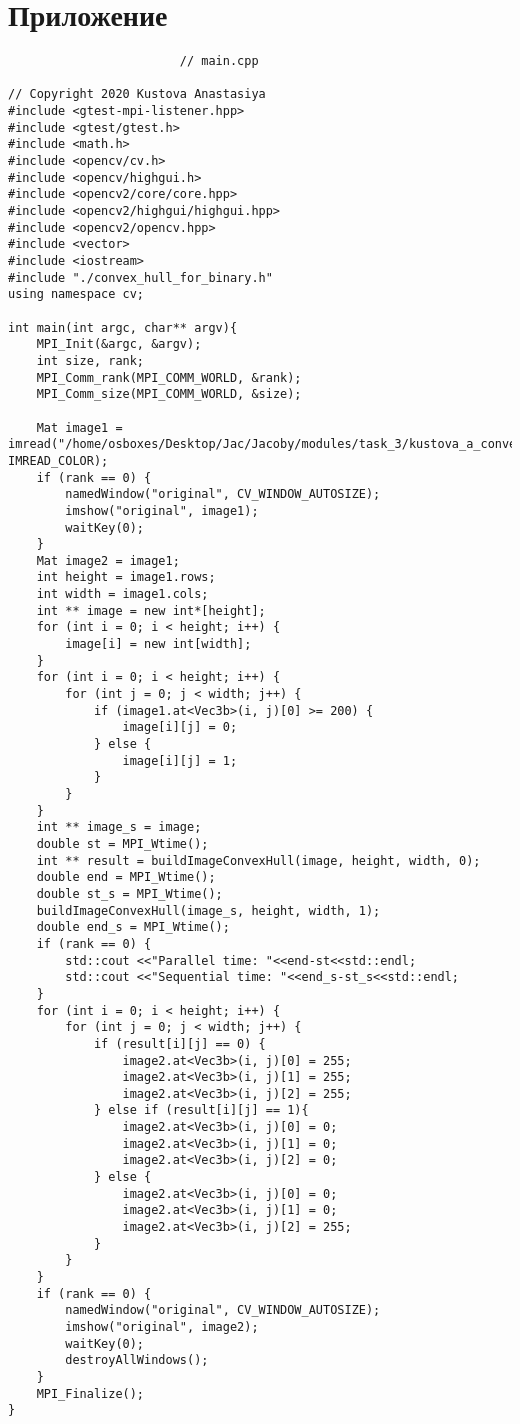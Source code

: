 \documentclass{report}
\begin{document}
\section*{Приложение}
\begin{lstlisting}
						// main.cpp

// Copyright 2020 Kustova Anastasiya
#include <gtest-mpi-listener.hpp>
#include <gtest/gtest.h>
#include <math.h>
#include <opencv/cv.h>
#include <opencv/highgui.h>
#include <opencv2/core/core.hpp>
#include <opencv2/highgui/highgui.hpp>
#include <opencv2/opencv.hpp>
#include <vector>
#include <iostream>
#include "./convex_hull_for_binary.h"
using namespace cv;

int main(int argc, char** argv){
    MPI_Init(&argc, &argv);
    int size, rank;
    MPI_Comm_rank(MPI_COMM_WORLD, &rank);
    MPI_Comm_size(MPI_COMM_WORLD, &size);

    Mat image1 = imread("/home/osboxes/Desktop/Jac/Jacoby/modules/task_3/kustova_a_convex_hull_for_binary/6.jpg", IMREAD_COLOR);
    if (rank == 0) {
        namedWindow("original", CV_WINDOW_AUTOSIZE);
        imshow("original", image1);
        waitKey(0);
    }
    Mat image2 = image1;
    int height = image1.rows;
    int width = image1.cols;
    int ** image = new int*[height];
    for (int i = 0; i < height; i++) {
        image[i] = new int[width];
    }
    for (int i = 0; i < height; i++) {
        for (int j = 0; j < width; j++) {
            if (image1.at<Vec3b>(i, j)[0] >= 200) {
                image[i][j] = 0;
            } else {
                image[i][j] = 1;
            }
        }
    }
    int ** image_s = image;
    double st = MPI_Wtime();
    int ** result = buildImageConvexHull(image, height, width, 0);
    double end = MPI_Wtime();
    double st_s = MPI_Wtime();
    buildImageConvexHull(image_s, height, width, 1);
    double end_s = MPI_Wtime();
    if (rank == 0) {
        std::cout <<"Parallel time: "<<end-st<<std::endl;
        std::cout <<"Sequential time: "<<end_s-st_s<<std::endl;
    } 
    for (int i = 0; i < height; i++) {
        for (int j = 0; j < width; j++) {
            if (result[i][j] == 0) {
                image2.at<Vec3b>(i, j)[0] = 255;
                image2.at<Vec3b>(i, j)[1] = 255;
                image2.at<Vec3b>(i, j)[2] = 255;
            } else if (result[i][j] == 1){
                image2.at<Vec3b>(i, j)[0] = 0;
                image2.at<Vec3b>(i, j)[1] = 0;
                image2.at<Vec3b>(i, j)[2] = 0;
            } else {
                image2.at<Vec3b>(i, j)[0] = 0;
                image2.at<Vec3b>(i, j)[1] = 0;
                image2.at<Vec3b>(i, j)[2] = 255;
            }
        }
    }
    if (rank == 0) {
        namedWindow("original", CV_WINDOW_AUTOSIZE);
        imshow("original", image2);
        waitKey(0);
        destroyAllWindows();
    }
    MPI_Finalize();
}
\end{lstlisting}
\end{document}

